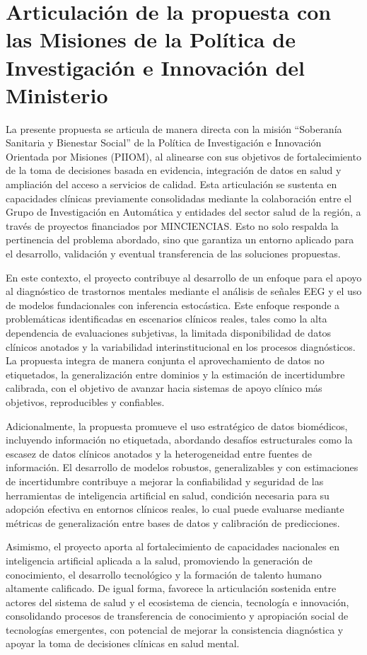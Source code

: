 \section{Articulación de la propuesta con las Misiones de la Política de Investigación e Innovación del Ministerio}

La presente propuesta se articula de manera directa con la misión “Soberanía Sanitaria y Bienestar Social” de la Política de Investigación e Innovación Orientada por Misiones (PIIOM), al alinearse con sus objetivos de fortalecimiento de la toma de decisiones basada en evidencia, integración de datos en salud y ampliación del acceso a servicios de calidad. Esta articulación se sustenta en capacidades clínicas previamente consolidadas mediante la colaboración entre el Grupo de Investigación en Automática y entidades del sector salud de la región, a través de proyectos financiados por MINCIENCIAS. Esto no solo respalda la pertinencia del problema abordado, sino que garantiza un entorno aplicado para el desarrollo, validación y eventual transferencia de las soluciones propuestas.

En este contexto, el proyecto contribuye al desarrollo de un enfoque para el apoyo al diagnóstico de trastornos mentales mediante el análisis de señales EEG y el uso de modelos fundacionales con inferencia estocástica. Este enfoque responde a problemáticas identificadas en escenarios clínicos reales, tales como la alta dependencia de evaluaciones subjetivas, la limitada disponibilidad de datos clínicos anotados y la variabilidad interinstitucional en los procesos diagnósticos. La propuesta integra de manera conjunta el aprovechamiento de datos no etiquetados, la generalización entre dominios y la estimación de incertidumbre calibrada, con el objetivo de avanzar hacia sistemas de apoyo clínico más objetivos, reproducibles y confiables.

Adicionalmente, la propuesta promueve el uso estratégico de datos biomédicos, incluyendo información no etiquetada, abordando desafíos estructurales como la escasez de datos clínicos anotados y la heterogeneidad entre fuentes de información. El desarrollo de modelos robustos, generalizables y con estimaciones de incertidumbre contribuye a mejorar la confiabilidad y seguridad de las herramientas de inteligencia artificial en salud, condición necesaria para su adopción efectiva en entornos clínicos reales, lo cual puede evaluarse mediante métricas de generalización entre bases de datos y calibración de predicciones.

Asimismo, el proyecto aporta al fortalecimiento de capacidades nacionales en inteligencia artificial aplicada a la salud, promoviendo la generación de conocimiento, el desarrollo tecnológico y la formación de talento humano altamente calificado. De igual forma, favorece la articulación sostenida entre actores del sistema de salud y el ecosistema de ciencia, tecnología e innovación, consolidando procesos de transferencia de conocimiento y apropiación social de tecnologías emergentes, con potencial de mejorar la consistencia diagnóstica y apoyar la toma de decisiones clínicas en salud mental.